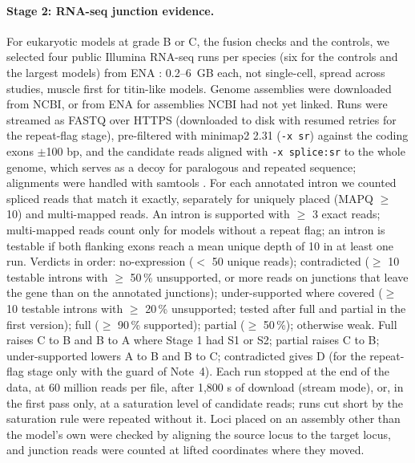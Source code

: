 \documentclass[11pt]{article}
\begin{document}
\paragraph{Stage 2: RNA-seq junction evidence.} For eukaryotic models at grade B or C, the fusion checks and the controls,
we selected four public Illumina RNA-seq runs per species (six for the controls and the largest models) from ENA
\citep{yuan2026}: 0.2--6~GB each, not single-cell, spread across studies, muscle first for titin-like models. Genome
assemblies were downloaded from NCBI, or from ENA for assemblies NCBI had not yet linked. Runs were streamed as FASTQ over
HTTPS (downloaded to disk with resumed retries for the repeat-flag stage), pre-filtered with minimap2 2.31 (\texttt{-x sr})
\citep{li2018} against the coding exons $\pm$100 bp, and the candidate reads aligned with \texttt{-x splice:sr} to the whole
genome, which serves as a decoy for paralogous and repeated sequence; alignments were handled with samtools
\citep{danecek2021}. For each annotated intron we counted spliced reads that match it exactly, separately for uniquely
placed (MAPQ $\geq$ 10) and multi-mapped reads. An intron is supported with $\geq$ 3 exact reads; multi-mapped reads count
only for models without a repeat flag; an intron is testable if both flanking exons reach a mean unique depth of 10 in at
least one run. Verdicts in order: no-expression ($<$ 50 unique reads); contradicted ($\geq$ 10 testable introns with
$\geq$ 50\,\% unsupported, or more reads on junctions that leave the gene than on the annotated junctions); under-supported
where covered ($\geq$ 10 testable introns with $\geq$ 20\,\% unsupported; tested after full and partial in the first
version); full ($\geq$ 90\,\% supported); partial ($\geq$ 50\,\%); otherwise weak. Full raises C to B and B to A where
Stage 1 had S1 or S2; partial raises C to B; under-supported lowers A to B and B to C; contradicted gives D (for the
repeat-flag stage only with the guard of Note~4). Each run stopped at the end of the data, at 60 million reads per file,
after 1,800 s of download (stream mode), or, in the first pass only, at a saturation level of candidate reads; runs cut short
by the saturation rule were repeated without it. Loci placed on an assembly other than the model's own were checked by
aligning the source locus to the target locus, and junction reads were counted at lifted coordinates where they moved.
\end{document}

